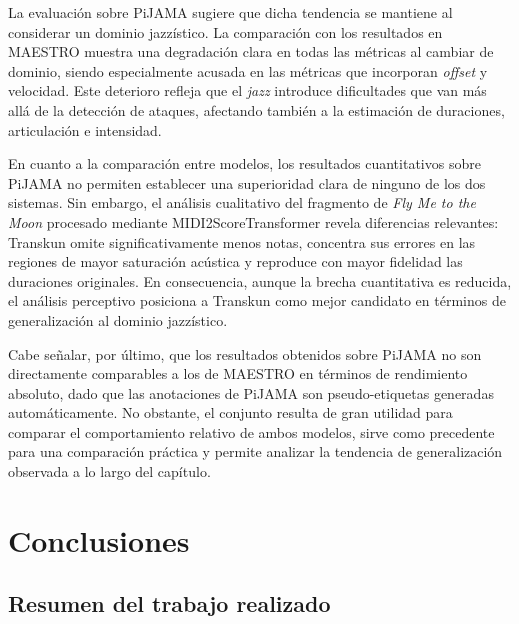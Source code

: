 \documentclass[11pt,spanish,listoffigures,listoftables]{tfgetsinf}
\begin{document}
La evaluación sobre PiJAMA sugiere que dicha tendencia se mantiene al considerar un dominio
jazzístico. La comparación con los resultados en MAESTRO muestra una degradación
clara en todas las métricas al cambiar de dominio, siendo especialmente acusada en las
métricas que incorporan \textit{offset} y velocidad. Este deterioro refleja que el \textit{jazz} introduce
dificultades que van más allá de la detección de ataques, afectando también a la
estimación de duraciones, articulación e intensidad.

En cuanto a la comparación entre modelos, los resultados cuantitativos sobre PiJAMA
no permiten establecer una superioridad clara de ninguno de los dos sistemas. Sin
embargo, el análisis cualitativo del fragmento de \textit{Fly Me to the Moon} procesado mediante
MIDI2ScoreTransformer revela diferencias relevantes: Transkun omite significativamente
menos notas, concentra sus errores en las regiones de mayor saturación acústica y
reproduce con mayor fidelidad las duraciones originales. En consecuencia, aunque la
brecha cuantitativa es reducida, el análisis perceptivo posiciona a Transkun como mejor
candidato en términos de generalización al dominio jazzístico.

Cabe señalar, por último, que los resultados obtenidos sobre PiJAMA no son directamente
comparables a los de MAESTRO en términos de rendimiento absoluto, dado que las
anotaciones de PiJAMA son pseudo-etiquetas generadas automáticamente. No obstante,
el conjunto resulta de gran utilidad para comparar el comportamiento relativo de ambos modelos, 
sirve como precedente para una comparación práctica y permite analizar la tendencia de generalización
observada a lo largo del capítulo.






\chapter{Conclusiones}
\label{chap:conclusiones}

\section{Resumen del trabajo realizado}
\end{document}
